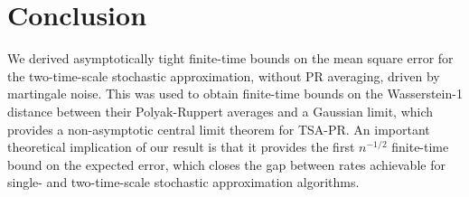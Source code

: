 \section{Conclusion}
We derived asymptotically tight finite-time bounds on the mean square error for the two-time-scale stochastic approximation, without PR averaging, driven by martingale noise. 
This was used to obtain finite-time bounds on the Wasserstein-1 distance between their Polyak-Ruppert averages and a Gaussian limit, which provides a non-asymptotic central limit theorem for TSA-PR. 
An important theoretical implication of our result is that it provides the first $n^{-1/2}$ finite-time bound on the expected error, which closes the gap between rates achievable for single- and two-time-scale stochastic approximation algorithms. 
